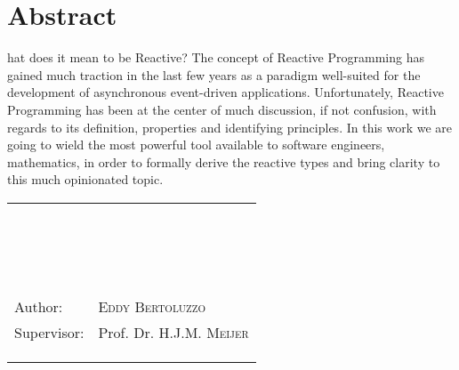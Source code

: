 %
%
%

\chapter*{Abstract}
hat does it mean to be Reactive? The concept of Reactive Programming has gained much traction in the last few years as a paradigm well-suited for the development of asynchronous  event-driven applications. Unfortunately, Reactive Programming has been at the center of much discussion, if not confusion, with regards to its definition, properties and identifying principles. In this work we are going to wield the most powerful tool available to software engineers, mathematics, in order to formally derive the reactive types and bring clarity to this much opinionated topic.

\begin{flushright}
\noindent\begin{tabular}{@{}ll@{}}
	\\\\\\\\\\\\\\\\\\\\\\\\\\\\\\\\\\\\
	Author: & \textsc{Eddy Bertoluzzo}\\
	Supervisor: & Prof. Dr. H.J.M. \textsc{Meijer}\\
	\\
	\\
	\\
\end{tabular}
\end{flushright}
\clearpage